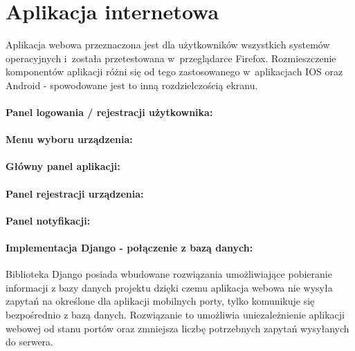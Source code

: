 \section*{Aplikacja internetowa}
Aplikacja webowa przeznaczona jest dla użytkowników wszystkich systemów operacyjnych i~została przetestowana w~przeglądarce Firefox. Rozmieszczenie komponentów aplikacji różni się od tego zastosowanego w~aplikacjach IOS oraz Android - spowodowane jest to inną rozdzielczością ekranu. 

\paragraph{Panel logowania / rejestracji użytkownika:}
\paragraph{Menu wyboru urządzenia:}
\paragraph{Główny panel aplikacji:}
\paragraph{Panel rejestracji urządzenia:}
\paragraph{Panel notyfikacji:}


\paragraph{Implementacja Django - połączenie z bazą danych:}
Biblioteka Django posiada wbudowane rozwiązania umożliwiające pobieranie informacji z bazy danych projektu dzięki czemu aplikacja webowa nie wysyła zapytań na określone dla aplikacji mobilnych porty, tylko komunikuje się bezpośrednio z bazą danych. Rozwiązanie to umożliwia uniezależnienie aplikacji webowej od stanu portów oraz zmniejsza liczbę potrzebnych zapytań wysyłanych do serwera.